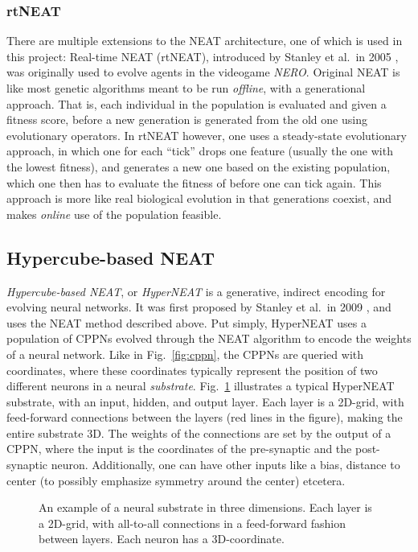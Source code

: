 \documentclass[a4paper]{article}
\numberwithin{equation}{section}
\begin{document}
\subsubsection{rtNEAT}
There are multiple extensions to the NEAT architecture, one of which is used in
this project: Real-time NEAT (rtNEAT), introduced by Stanley et al.\ in 2005
\cite{stanley2005evolving}, was originally used to evolve agents in the
videogame \emph{NERO}. Original NEAT is like most genetic algorithms meant to be
run \emph{offline}, with a generational approach. That is, each individual in
the population is evaluated and given a fitness score, before a new generation
is generated from the old one using evolutionary operators. In rtNEAT however,
one uses a steady-state evolutionary approach, in which one for each ``tick''
drops one feature (usually the one with the lowest fitness), and generates a new
one based on the existing population, which one then has to evaluate the fitness
of before one can tick again. This approach is more like real biological
evolution in that generations coexist, and makes \emph{online} use of the
population feasible.

\subsection{Hypercube-based NEAT}
\emph{Hypercube-based NEAT}, or \emph{HyperNEAT} is a generative, indirect
encoding for evolving neural networks. It was first proposed by Stanley et al.\
in 2009 \cite{stanley2009hypercube}, and uses the NEAT method described above.
Put simply, HyperNEAT uses a population of CPPNs evolved through the NEAT
algorithm to encode the weights of a neural network. Like in
Fig.~\ref{fig:cppn}, the CPPNs are queried with coordinates, where these
coordinates typically represent the position of two different neurons in a
neural \emph{substrate}. Fig.~\ref{fig:substrate} illustrates a typical
HyperNEAT substrate, with an input, hidden, and output layer. Each layer is a
2D-grid, with feed-forward connections between the layers (red lines in the
figure), making the entire substrate 3D. The weights of the connections are set
by the output of a CPPN, where the input is the coordinates of the pre-synaptic
and the post-synaptic neuron. Additionally, one can have other inputs like a
bias, distance to center (to possibly emphasize symmetry around the center)
etcetera.

\begin{figure}[ht]
    \centering
    \resizebox{\textwidth}{!}{}
    \caption{An example of a neural substrate in three dimensions. Each layer is
    a 2D-grid, with all-to-all connections in a feed-forward fashion between
    layers. Each neuron has a 3D-coordinate.}
    \label{fig:substrate}
\end{figure}
\end{document}
